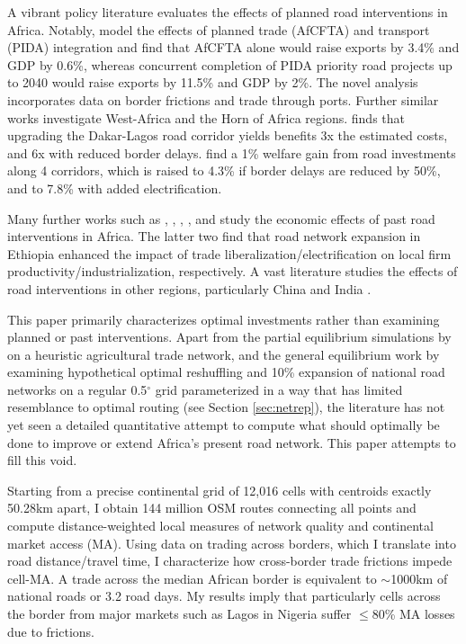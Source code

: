 \documentclass[a4paper]{article}
\begin{document}
A vibrant policy literature evaluates the effects of planned road interventions in Africa. Notably,  \citet{fontagne2023trade} model the effects of planned trade (AfCFTA) and transport (PIDA) integration and find that AfCFTA alone would raise exports by 3.4\% and GDP by 0.6\%, whereas concurrent completion of PIDA priority road projects up to 2040 would raise exports by 11.5\% and GDP by 2\%. The novel analysis incorporates data on border frictions and trade through ports. Further similar works investigate West-Africa \citep{lebrand2023corridors} and the Horn of Africa \citep{herrera2023infrastructure} regions. \citet{lebrand2023corridors} finds that upgrading the Dakar-Lagos road corridor yields benefits 3x the estimated costs, and 6x with reduced border delays. \citet{herrera2023infrastructure} find a 1\% welfare gain from road investments along 4 corridors, which is raised to 4.3\% if border delays are reduced by 50\%, and to 7.8\% with added electrification. \newline 

Many further works such as \citet{jedwab2022average}, \citet{Peng2021}, \citet{abbasi2022roads}, \citet{fiorini2021trade}, and \citet{moneke2020infrastructure} study the economic effects of past road interventions in Africa. The latter two find that road network expansion in Ethiopia enhanced the impact of trade liberalization/electrification on local firm productivity/industrialization, respectively. A vast literature studies the effects of road interventions in other regions, particularly China \citep{faber2014trade, baum2020does} and India \citep{asher2020rural, alder2016chinese}.\newline

This paper primarily characterizes optimal investments rather than examining planned or past interventions. Apart from the partial equilibrium simulations by \citet{porteous2019high} on a heuristic agricultural trade network, and the general equilibrium work by \citet{graff2019spatial} examining hypothetical optimal reshuffling and 10\% expansion of national road networks on a regular 0.5$^\circ$ grid parameterized in a way that has limited resemblance to optimal routing (see Section \ref{sec:netrep}), the literature has not yet seen a detailed quantitative attempt to compute what should optimally be done to improve or extend Africa's present road network. This paper attempts to fill this void. \newline 
 
  Starting from a precise continental grid of 12,016 cells with centroids exactly 50.28km apart, I obtain 144 million OSM routes connecting all points and compute distance-weighted local measures of network quality and continental market access (MA). Using data on trading across borders, which I translate into road distance/travel time, I characterize how cross-border trade frictions impede cell-MA. A trade across the median African border is equivalent to $\sim$1000km of national roads or 3.2 road days. My results imply that particularly cells across the border from major markets such as Lagos in Nigeria suffer $\leq$80\% MA losses due to frictions. \newline  
  
\end{document}

